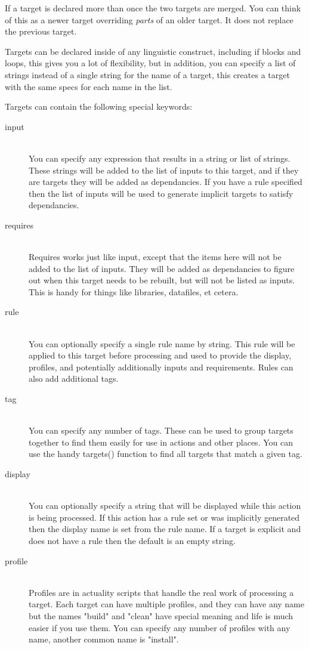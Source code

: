 \documentclass[letterpaper]{book}
\begin{document}
If a target is declared more than once the two targets are merged.  You can
think of this as a newer target overriding \emph{parts} of an older target.  It
does not replace the previous target.

Targets can be declared inside of any linguistic construct, including if blocks
and loops, this gives you a lot of flexibility, but in addition, you can
specify a list of strings instead of a single string for the name of a target,
this creates a target with the same specs for each name in the list.

Targets can contain the following special keywords:

\begin{description}
    \item[input] \hfill \\
    You can specify any expression that results in a string or list of strings.
    These strings will be added to the list of inputs to this target, and if
    they are targets they will be added as dependancies.  If you have a rule
    specified then the list of inputs will be used to generate implicit targets
    to satisfy dependancies.
    \item[requires] \hfill \\
    Requires works just like input, except that the items here will not be added
    to the list of inputs.  They will be added as dependancies to figure out
    when this target needs to be rebuilt, but will not be listed as inputs.
    This is handy for things like libraries, datafiles, et cetera.
    \item[rule] \hfill \\
    You can optionally specify a single rule name by string.  This rule will be
    applied to this target before processing and used to provide the display,
    profiles, and potentially additionally inputs and requirements.  Rules can
    also add additional tags.
    \item[tag] \hfill \\
    You can specify any number of tags.  These can be used to group targets
    together to find them easily for use in actions and other places.  You can
    use the handy targets() function to find all targets that match a given tag.
    \item[display] \hfill \\
    You can optionally specify a string that will be displayed while this
    action is being processed.  If this action has a rule set or was implicitly
    generated then the display name is set from the rule name.  If a target is
    explicit and does not have a rule then the default is an empty string.
    \item[profile] \hfill \\
    Profiles are in actuality scripts that handle the real work of processing
    a target.  Each target can have multiple profiles, and they can have any
    name but the names "build" and "clean" have special meaning and life is
    much easier if you use them.  You can specify any number of profiles with
    any name, another common name is  "install".
\end{description}
\end{document}
